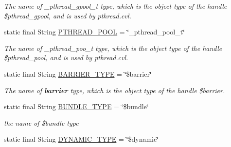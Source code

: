 \begin{DoxyCompactItemize}
\begin{DoxyCompactList}\small\item\em The name of \+\_\+pthread\+\_\+gpool\+\_\+t type, which is the object type of the handle \$pthread\+\_\+gpool, and is used by pthread.\+cvl. \end{DoxyCompactList}\item 
\hypertarget{classedu_1_1udel_1_1cis_1_1vsl_1_1civl_1_1model_1_1IF_1_1ModelConfiguration_a33810403b1d83e142623197a479ecadf}{}static final String \hyperlink{classedu_1_1udel_1_1cis_1_1vsl_1_1civl_1_1model_1_1IF_1_1ModelConfiguration_a33810403b1d83e142623197a479ecadf}{P\+T\+H\+R\+E\+A\+D\+\_\+\+P\+O\+O\+L} = \char`\"{}\+\_\+pthread\+\_\+pool\+\_\+t\char`\"{}\label{classedu_1_1udel_1_1cis_1_1vsl_1_1civl_1_1model_1_1IF_1_1ModelConfiguration_a33810403b1d83e142623197a479ecadf}

\begin{DoxyCompactList}\small\item\em The name of \+\_\+pthread\+\_\+poo\+\_\+t type, which is the object type of the handle \$pthread\+\_\+pool, and is used by pthread.\+cvl. \end{DoxyCompactList}\item 
\hypertarget{classedu_1_1udel_1_1cis_1_1vsl_1_1civl_1_1model_1_1IF_1_1ModelConfiguration_a419724810fb17fcaa408e3904322223b}{}static final String \hyperlink{classedu_1_1udel_1_1cis_1_1vsl_1_1civl_1_1model_1_1IF_1_1ModelConfiguration_a419724810fb17fcaa408e3904322223b}{B\+A\+R\+R\+I\+E\+R\+\_\+\+T\+Y\+P\+E} = \char`\"{}\$barrier\char`\"{}\label{classedu_1_1udel_1_1cis_1_1vsl_1_1civl_1_1model_1_1IF_1_1ModelConfiguration_a419724810fb17fcaa408e3904322223b}

\begin{DoxyCompactList}\small\item\em The name of {\bfseries barrier} type, which is the object type of the handle \$barrier. \end{DoxyCompactList}\item 
\hypertarget{classedu_1_1udel_1_1cis_1_1vsl_1_1civl_1_1model_1_1IF_1_1ModelConfiguration_a59dfa0aade6e92eefd316afc0daf91fa}{}static final String \hyperlink{classedu_1_1udel_1_1cis_1_1vsl_1_1civl_1_1model_1_1IF_1_1ModelConfiguration_a59dfa0aade6e92eefd316afc0daf91fa}{B\+U\+N\+D\+L\+E\+\_\+\+T\+Y\+P\+E} = \char`\"{}\$bundle\char`\"{}\label{classedu_1_1udel_1_1cis_1_1vsl_1_1civl_1_1model_1_1IF_1_1ModelConfiguration_a59dfa0aade6e92eefd316afc0daf91fa}

\begin{DoxyCompactList}\small\item\em the name of \$bundle type \end{DoxyCompactList}\item 
\hypertarget{classedu_1_1udel_1_1cis_1_1vsl_1_1civl_1_1model_1_1IF_1_1ModelConfiguration_afd3c4b06d91440a0971b000632b83096}{}static final String \hyperlink{classedu_1_1udel_1_1cis_1_1vsl_1_1civl_1_1model_1_1IF_1_1ModelConfiguration_afd3c4b06d91440a0971b000632b83096}{D\+Y\+N\+A\+M\+I\+C\+\_\+\+T\+Y\+P\+E} = \char`\"{}\$dynamic\char`\"{}\label{classedu_1_1udel_1_1cis_1_1vsl_1_1civl_1_1model_1_1IF_1_1ModelConfiguration_afd3c4b06d91440a0971b000632b83096}


\end{DoxyCompactItemize}
